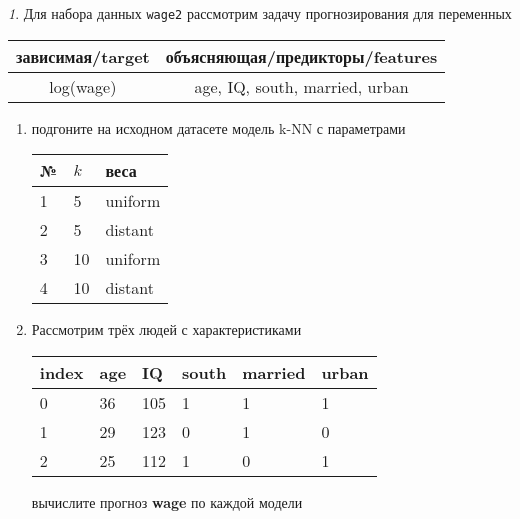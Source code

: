 \documentclass[12pt]{article}
\theoremstyle{remark}
\newtheorem{exercise}{}[section]
\begin{document}
\begin{exercise}
Для набора данных \texttt{wage2} рассмотрим задачу прогнозирования
для переменных
\begin{center}
	\begin{tabular}{|c|c|}\hline
		зависимая/target & объясняющая/предикторы/features \\ \hline
		log(wage) & age, IQ, south, married, urban \\ \hline
	\end{tabular}
\end{center}
\begin{enumerate}
	\item подгоните на исходном датасете модель k-NN с параметрами
	\begin{center}
		\begin{tabular}{|l|l|l|}\hline
		№ & \(k\) & веса \\ \hline
		1 & 5 & uniform \\
		2 & 5 & distant \\
		3 & 10 & uniform \\
		4 & 10 & distant \\ \hline
		\end{tabular}
	\end{center}
	\item Рассмотрим трёх людей с характеристиками
	\begin{center}
		\begin{tabular}{|l||l|l|l|l|l|}\hline
			index & age & IQ & south & married & urban \\ \hline\hline
			0 & 36 & 105 & 1 & 1 & 1 \\
			1 & 29 & 123 & 0 & 1 & 0 \\
			2 & 25 & 112 & 1 & 0 & 1 \\ \hline
		\end{tabular}
	\end{center}
	вычислите прогноз \textbf{wage} по каждой модели
\end{enumerate}
\end{exercise}
\end{document}

